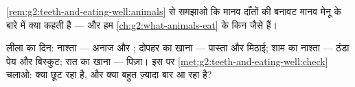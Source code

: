 \begin{exercise}[$\star\star$]\label{exo:g2:teeth-and-eating-well:9}
\cref{rem:g2:teeth-and-eating-well:animals} से समझाओ कि मानव दाँतों की
बनावट मानव मेनू के बारे में क्या कहती है --- और हम
\cref{ch:g2:what-animals-eat} के किन  जैसे हैं।
\end{exercise}

\begin{exercise}[$\star\star$]\label{exo:g2:teeth-and-eating-well:10}
लीला का दिन: नाश्ता --- अनाज और ; दोपहर का खाना --- पास्ता और
मिठाई; शाम का नाश्ता --- ठंडा पेय और बिस्कुट; रात का खाना --- पिज़ा।
इस पर \cref{met:g2:teeth-and-eating-well:check} चलाओ: क्या छूट रहा है,
और क्या बहुत ज़्यादा बार आ रहा है?
\end{exercise}
